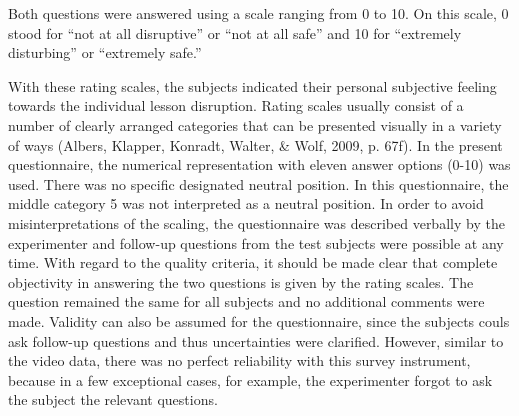 \documentclass[
  man]{apa6}
\begin{document}
Both questions were answered using a scale ranging from 0 to 10. On this scale, 0 stood for ``not at all disruptive'' or ``not at all safe'' and 10 for ``extremely disturbing'' or ``extremely safe.''

With these rating scales, the subjects indicated their personal subjective feeling towards the individual lesson disruption. Rating scales usually consist of a number of clearly arranged categories that can be presented visually in a variety of ways (Albers, Klapper, Konradt, Walter, \& Wolf, 2009, p. 67f). In the present questionnaire, the numerical representation with eleven answer options (0-10) was used. There was no specific designated neutral position. In this questionnaire, the middle category 5 was not interpreted as a neutral position. In order to avoid misinterpretations of the scaling, the questionnaire was described verbally by the experimenter and follow-up questions from the test subjects were possible at any time. With regard to the quality criteria, it should be made clear that complete objectivity in answering the two questions is given by the rating scales. The question remained the same for all subjects and no additional comments were made. Validity can also be assumed for the questionnaire, since the subjects couls ask follow-up questions and thus uncertainties were clarified. However, similar to the video data, there was no perfect reliability with this survey instrument, because in a few exceptional cases, for example, the experimenter forgot to ask the subject the relevant questions.
\end{document}
